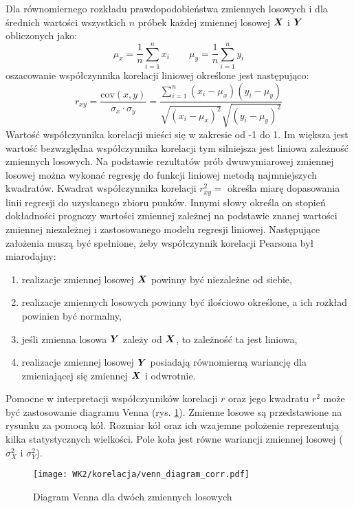 \begin{appendices}
Dla równomiernego rozkładu prawdopodobieństwa zmiennych losowych i dla średnich wartości wszystkich $n$ próbek każdej zmiennej losowej $\bm{X}$ i $\bm{Y}$ obliczonych jako:
\begin{equation}
\mu_x=\frac{1}{n}\sum_{i=1}^{n}x_i \qquad \mu_y=\frac{1}{n}\sum_{i=1}^{n}y_i
\end{equation}
oszacowanie współczynnika korelacji liniowej określone jest następująco:
\begin{equation}
	r_{xy}=\frac{\mathrm{cov}(x,y)}{\sigma_x\cdot\sigma_y}=\frac{\sum_{i=1}^{n}(x_i-\mu_x)(y_i-\mu_y)}{\sqrt{(x_i-\mu_x)^2}\sqrt{(y_i-\mu_y)^2}}
\end{equation}
Wartość współczynnika korelacji mieści się w zakresie od -1 do 1. Im większa jest wartość bezwzględna współczynnika korelacji tym silniejsza jest liniowa zależność zmiennych losowych. Na podstawie rezultatów prób dwuwymiarowej zmiennej losowej można wykonać regresję do funkcji liniowej metodą najmniejszych kwadratów. Kwadrat współczynnika korelacji $r_{xy}^2=$ określa miarę dopasowania linii regresji do uzyskanego zbioru punków. Innymi słowy określa on stopień dokładności prognozy wartości zmiennej zależnej na podstawie znanej wartości zmiennej niezależnej i zastosowanego modelu regresji liniowej. Następujące założenia muszą być spełnione, żeby współczynnik korelacji Pearsona był miarodajny:
\begin{enumerate}
	\item realizacje zmiennej losowej $\bm{X}$ powinny być niezależne od siebie,
	\item realizacje zmiennych losowych powinny być ilościowo określone, a ich rozkład powinien być normalny,
	\item jeśli zmienna losowa $\bm{Y}$ zależy od $\bm{X}$, to zależność ta jest liniowa,
	\item realizacje zmiennej losowej $\bm{Y}$ posiadają równomierną wariancję dla zmieniającej się zmiennej $\bm{X}$ i odwrotnie.
\end{enumerate}

Pomocne w interpretacji współczynników korelacji $r$ oraz jego kwadratu $r^2$ może być zastosowanie diagramu Venna (rys. \ref{fig:venn_diag_corr}). Zmienne losowe są przedstawione na rysunku za pomocą kół. Rozmiar kół oraz ich wzajemne położenie reprezentują kilka statystycznych wielkości. Pole koła jest równe wariancji zmiennej losowej ($\sigma_X^2$ i $\sigma_Y^2$). 

\begin{figure}[hbt!]
	\centering
	\texttt{[image: WK2/korelacja/venn\_diagram\_corr.pdf]}
	\captionsetup{justification=centering}
	\caption{Diagram Venna dla dwóch zmiennych losowych}
	\label{fig:venn_diag_corr}
\end{figure}


\end{appendices}
